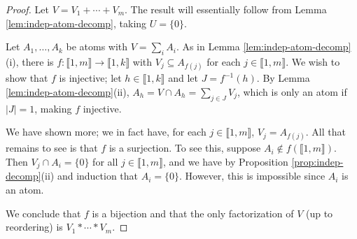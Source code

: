 \documentclass{report}
\newcommand{\llb}{\llbracket}
\newcommand{\rrb}{\rrbracket}
\renewcommand{\:}{\text{:}}
\theoremstyle{definition}
\begin{document}
\begin{proof}
Let $V = V_1+\cdots + V_m$.
The result will essentially follow from Lemma \ref{lem:indep-atom-decomp}, taking $U = \{0\}$.

Let $A_1,\dots, A_k$ be atoms with $V = \sum_i A_i$.
As in Lemma \ref{lem:indep-atom-decomp}(i), there is $f:\llb 1,m \rrb \to \llb 1,k\rrb$ with $V_j \subseteq A_{f(j)}$ for each $j\in \llb 1,m\rrb$.
We wish to show that $f$ is injective; let $h\in \llb 1,k \rrb$ and let $J = f^{-1}(h)$.
By Lemma \ref{lem:indep-atom-decomp}(ii), $A_h = V \cap A_h = \sum_{j\in J} V_j$, which is only an atom if $|J|=1$, making $f$ injective.  

We have shown more; we in fact have, for each $j\in \llb 1,m \rrb$, $V_j = A_{f(j)}$.
All that remains to see is that $f$ is a surjection.
To see this, suppose $A_i \notin f(\llb 1,m \rrb)$.
Then $V_j \cap A_i = \{0\}$ for all $j\in  \llb 1,m \rrb$, and we have by Proposition \ref{prop:indep-decomp}(ii) and induction that $A_i = \{0\}$.
However, this is impossible since $A_i$ is an atom.  

We conclude that $f$ is a bijection and that the only factorization of $V$ (up to reordering) is $V_1*\cdots*V_m$.
\end{proof}
\end{document}
